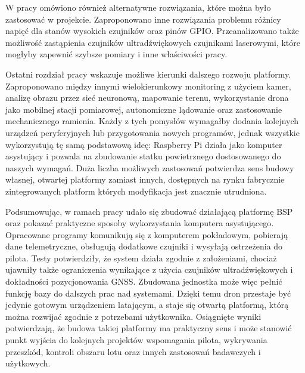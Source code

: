 \documentclass[a4paper,12pt]{book}
\begin{document}
    W pracy omówiono również alternatywne rozwiązania, które można było zastosować w projekcie. Zaproponowano inne rozwiązania problemu różnicy napięć dla stanów wysokich czujników oraz pinów GPIO. 
    Przeanalizowano także możliwość zastąpienia czujników ultradźwiękowych czujnikami laserowymi, które mogłyby zapewnić szybsze pomiary i inne właściwości pracy.\par
    Ostatni rozdział pracy wskazuje możliwe kierunki dalszego rozwoju platformy. Zaproponowano między innymi wielokierunkowy monitoring z użyciem kamer, analizę obrazu przez sieć neuronową, 
    mapowanie terenu, wykorzystanie drona jako mobilnej stacji pomiarowej, autonomiczne lądowanie oraz zastosowanie mechanicznego ramienia. Każdy z tych pomysłów wymagałby dodania kolejnych 
    urządzeń peryferyjnych lub przygotowania nowych programów, jednak wszystkie wykorzystują tę samą podstawową ideę: Raspberry Pi działa jako komputer asystujący i pozwala na zbudowanie statku powietrznego 
    dostosowanego do naszych wymagań. Duża liczba możliwych zastosowań potwierdza sens budowy własnej, otwartej platformy zamiast innych, dostępnych na rynku fabrycznie zintegrowanych platform których modyfikacja 
    jest znacznie utrudniona.\par
    Podsumowując, w ramach pracy udało się zbudować działającą platformę BSP oraz pokazać praktyczne sposoby wykorzystania komputera asystującego. Opracowane programy komunikują się z komputerem pokładowym, 
    pobierają dane telemetryczne, obsługują dodatkowe czujniki i wysyłają ostrzeżenia do pilota. Testy potwierdziły, że system działa zgodnie z założeniami, chociaż ujawniły także ograniczenia wynikające z 
    użycia czujników ultradźwiękowych i dokładności pozycjonowania GNSS. Zbudowana jednostka może więc pełnić funkcję bazy do dalszych prac nad systemami. Dzięki temu dron przestaje być jedynie gotowym urządzeniem 
    latającym, a staje się otwartą platformą, którą można rozwijać zgodnie z potrzebami użytkownika. Osiągnięte wyniki potwierdzają, że budowa takiej platformy ma praktyczny sens i może stanowić punkt 
    wyjścia do kolejnych projektów wspomagania pilota, wykrywania przeszkód, kontroli obszaru lotu oraz innych zastosowań badawczych i użytkowych.
\label{sec:bibliografia}

\end{document}
